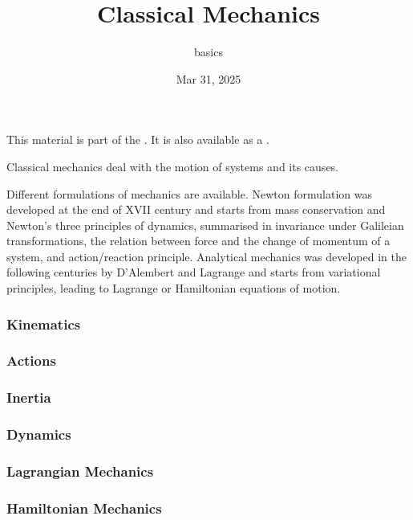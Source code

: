 \documentclass[letterpaper,10pt,english]{jupyterBook}
\title{Classical Mechanics}
\date{Mar 31, 2025}
\author{basics}
\begin{document}
\pagestyle{empty}
\sphinxmaketitle
\pagestyle{plain}
\sphinxtableofcontents
\pagestyle{normal}
\label{\detokenize{intro::doc}}


\sphinxAtStartPar
This material is part of the . It is also available as a .

\sphinxAtStartPar
Classical mechanics deal with the motion of systems and its causes.

\sphinxAtStartPar
Different formulations of mechanics are available. Newton formulation was developed at the end of XVII century and starts from mass conservation and Newton’s three principles of dynamics, summarised in invariance under Galileian transformations, the relation between force and the change of momentum of a system, and action/reaction principle. Analytical mechanics was developed in the following centuries by D’Alembert and Lagrange and starts from variational principles, leading to Lagrange or Hamiltonian equations of motion.

\sphinxAtStartPar
{}
\subsubsection*{Kinematics}
\subsubsection*{Actions}
\subsubsection*{Inertia}
\subsubsection*{Dynamics}

\sphinxAtStartPar
{}
\subsubsection*{Lagrangian Mechanics}
\subsubsection*{Hamiltonian Mechanics}
\end{document}
